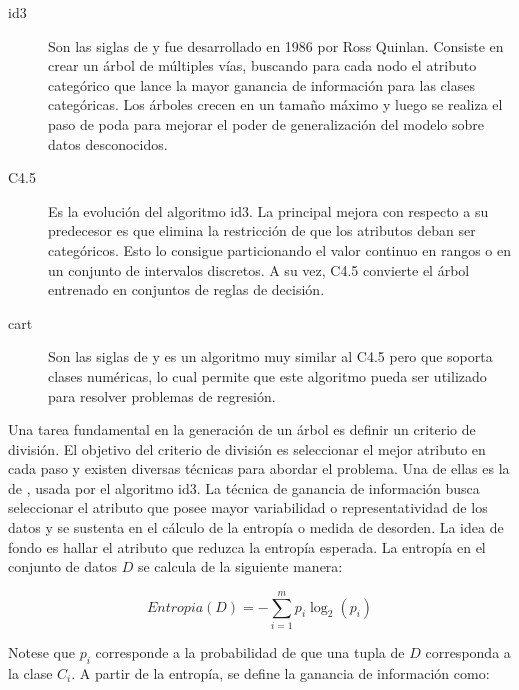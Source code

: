 \begin{description} 

   \item[\acrshort{id3}] Son las siglas de  y
      fue desarrollado en 1986 por Ross Quinlan. Consiste en crear un árbol de
      múltiples vías, buscando para cada nodo el atributo categórico que lance
      la mayor ganancia de información para las clases categóricas. Los árboles
      crecen en un tamaño máximo y luego se realiza el paso de poda para mejorar
      el poder de generalización del modelo sobre datos desconocidos.

   \item[C4.5] Es la evolución del algoritmo \acrshort{id3}. La principal mejora
      con respecto a su predecesor es que elimina la restricción de que los
      atributos deban ser categóricos. Esto lo consigue particionando el valor
      continuo en rangos o en un conjunto de intervalos discretos. A su vez,
      C4.5 convierte el árbol entrenado en conjuntos de reglas de decisión. 

   \item[\acrshort{cart}] Son las siglas de  y
      es un algoritmo muy similar al C4.5 pero que soporta clases numéricas, lo
      cual permite que este algoritmo pueda ser utilizado para resolver
      problemas de regresión. 

\end{description}

Una tarea fundamental en la generación de un árbol es definir un criterio de
división. El objetivo del criterio de división es seleccionar el mejor atributo
en cada paso y existen diversas técnicas para abordar el problema. Una de ellas
es la de , usada por el algoritmo
\acrshort{id3}. La técnica de ganancia de información busca seleccionar el
atributo que posee mayor variabilidad o representatividad de los datos y se
sustenta en el cálculo de la entropía o medida de desorden. La idea de fondo es
hallar el atributo que reduzca la entropía esperada. La entropía en el conjunto
de datos $D$ se calcula de la siguiente manera:

\begin{equation}
   Entropia(D) = - \sum_{i=1}^{m} p_{i}\log_{2}(p_{i})
\end{equation} 

Notese que $p_{i}$ corresponde a la probabilidad de que una tupla de $D$
corresponda a la clase $C_{i}$.  A partir de la entropía, se define la ganancia
de información como:

